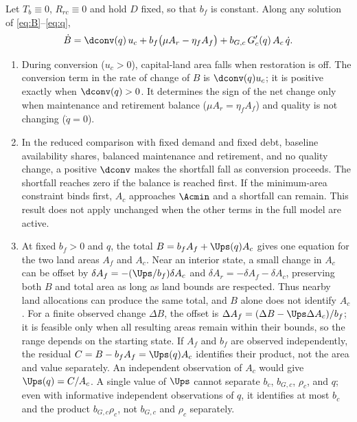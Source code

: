 \begin{proposition}\label{prop:mask}
Let $T_b\equiv0$, $R_{rc}\equiv0$ and hold $D$ fixed, so that $b_f$ is constant. Along any solution of \eqref{eq:B}--\eqref{eq:q},
\begin{equation}\label{eq:identity}
\dot B=\dconv(q)\,u_c+b_f\big(\mu A_r-\eta_f A_f\big)+b_{G,c}\,G_c'(q)\,A_c\,\dot q .
\end{equation}
\begin{enumerate}[label=(\roman*)]
\item During conversion ($u_c>0$), capital-land area falls when restoration is off. The conversion term in the rate of change of $B$ is $\dconv(q)u_c$; it is positive exactly when $\dconv(q)>0$. It determines the sign of the net change only when maintenance and retirement balance ($\mu A_r=\eta_fA_f$) and quality is not changing ($\dot q=0$).
\item In the reduced comparison with fixed demand and fixed debt, baseline availability shares, balanced maintenance and retirement, and no quality change, a positive $\dconv$ makes the shortfall fall as conversion proceeds. The shortfall reaches zero if the balance is reached first. If the minimum-area constraint binds first, $A_c$ approaches $\Acmin$ and a shortfall can remain. This result does not apply unchanged when the other terms in the full model are active.
\item At fixed $b_f>0$ and $q$, the total $B=b_fA_f+\Ups(q)A_c$ gives one equation for the two land areas $A_f$ and $A_c$. Near an interior state, a small change in $A_c$ can be offset by $\delta A_f=-(\Ups/b_f)\delta A_c$ and $\delta A_r=-\delta A_f-\delta A_c$, preserving both $B$ and total area as long as land bounds are respected. Thus nearby land allocations can produce the same total, and $B$ alone does not identify $A_c$. For a finite observed change $\Delta B$, the offset is $\Delta A_f=(\Delta B-\Ups\Delta A_c)/b_f$; it is feasible only when all resulting areas remain within their bounds, so the range depends on the starting state. If $A_f$ and $b_f$ are observed independently, the residual $C=B-b_fA_f=\Ups(q)A_c$ identifies their product, not the area and value separately. An independent observation of $A_c$ would give $\Ups(q)=C/A_c$. A single value of $\Ups$ cannot separate $b_c$, $b_{G,c}$, $\rho_c$, and $q$; even with informative independent observations of $q$, it identifies at most $b_c$ and the product $b_{G,c}\rho_c$, not $b_{G,c}$ and $\rho_c$ separately.
\end{enumerate}
\end{proposition}


